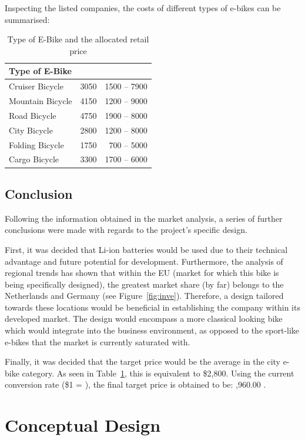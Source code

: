 \documentclass[a4paper,11pt]{article}
\begin{document}
Inspecting the listed companies, the costs of different types of e-bikes can be summarised:

\begin{table}[!ht]
	\centering
	\caption{Type of E-Bike and the allocated retail price}
	\begin{tabular}{l r r}
		\hline
		Type of E-Bike&\makecell[l]{Average Cost (\$)}&\makecell[l]{Range (\$)}\\ \hline
		Cruiser Bicycle	&3050	&1500 -- 7900\\
		Mountain Bicycle	&4150	&1200 -- 9000\\
		Road Bicycle	&4750	&1900 -- 8000\\
		City Bicycle	&2800	&1200 -- 8000\\
		Folding Bicycle	&1750	&700 -- 5000\\
		Cargo Bicycle	&3300	&1700 -- 6000\\
	\end{tabular}
	\label{tab:pri}
\end{table}

\subsection{Conclusion}
\label{sec:caac}

Following the information obtained in the market analysis, a series of further conclusions were made with regards to the project's specific design. 

First, it was decided that Li-ion batteries would be used due to their technical advantage and future potential for development. Furthermore, the analysis of regional trends has shown that within the EU (market for which this bike is being specifically designed), the greatest market share (by far) belongs to the Netherlands and Germany (see Figure~\ref{fig:inve}). Therefore, a design tailored towards these locations would be beneficial in establishing the company within its developed market. The design would encompass a more classical looking bike which would integrate into the business environment, as opposed to the sport-like e-bikes that the market is currently saturated with. 

Finally, it was decided that the target price would be the average in the city e-bike category. As seen in Table~\ref{tab:pri}, this is equivalent to \$2,800. Using the current conversion rate (\$1 = ), the final target price is obtained to be: ,960.00 \cite{xe}.

\section{Conceptual Design}
\end{document}
